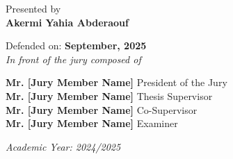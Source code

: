 \begin{titlepage}
\normalsize Presented by\\
{\normalsize \textbf{Akermi Yahia Abderaouf}}\\

\vspace{0.2cm}

{\normalsize Defended on: \textbf{September, 2025}}\\
{\normalsize \textit{In front of the jury composed of}}\\

\vspace{0.2cm}

\begin{center}
    {\normalsize \textbf{Mr. [Jury Member Name]} \hfill President of the Jury}\\
    {\normalsize \textbf{Mr. [Jury Member Name]} \hfill Thesis Supervisor}\\
    {\normalsize \textbf{Mr. [Jury Member Name]} \hfill Co-Supervisor}\\
    {\normalsize \textbf{Mr. [Jury Member Name]} \hfill Examiner}\\
\end{center}

\vspace{0.5cm}

\normalsize \textit{Academic Year: 2024/2025}
\end{titlepage}
